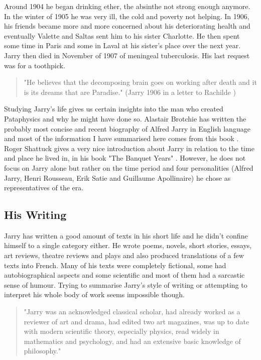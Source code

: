 Around 1904 he began drinking ether, the absinthe not strong enough anymore. In the winter of 1905 he was very ill, the cold and poverty not helping. In 1906, his friends became more and more concerned about his deteriorating health and eventually Valette and Saltas sent him to his sister Charlotte. He then spent some time in Paris and some in Laval at his sister's place over the next year. Jarry then died in November of 1907 of meningeal tuberculosis. His last request was for a toothpick.

\begin{quote}
  "He believes that the decomposing brain goes on working after death and it is its dreams that are Paradise." (Jarry 1906 in a letter to Rachilde \citep{Brotchie2007})
\end{quote}

Studying Jarry's life gives us certain insights into the man who created Pataphysics and why he might have done so. Alastair Brotchie has written the probably most concise and recent biography of Alfred Jarry in English language and most of the information I have summarised here comes from this book \citep{Brotchie2011}. Roger Shattuck gives a very nice introduction about Jarry in relation to the time and place he lived in, in his book "The Banquet Years" \citep{Shattuck1959}. However, he does not focus on Jarry alone but rather on the time period and four personalities (Alfred Jarry, Henri Rousseau, Erik Satie and Guillaume Apollinaire) he chose as representatives of the era.


\subsection{His Writing}

Jarry has written a good amount of texts in his short life and he didn't confine himself to a single category either. He wrote poems, novels, short stories, essays, art reviews, theatre reviews and plays and also produced translations of a few texts into French. Many of his texts were completely fictional, some had autobiographical aspects and some scientific and most of them had a sarcastic sense of humour. Trying to summarise Jarry's style of writing or attempting to interpret his whole body of work seems impossible though.

\begin{quote}
  "Jarry was an acknowledged classical scholar, had already worked as a reviewer of art and drama, had edited two art magazines, was up to date with modern scientific theory, especially physics, read widely in mathematics and psychology, and had an extensive basic knowledge of philosophy." \citep{Brotchie2011}
\end{quote}

